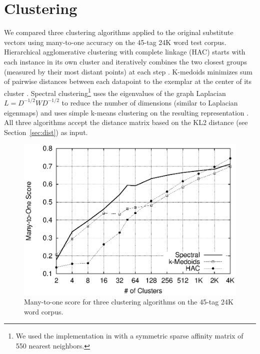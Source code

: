 \section{Clustering}
\label{sec:clustering}

We compared three clustering algorithms applied to the original
substitute vectors using many-to-one accuracy on the 45-tag 24K word
test corpus.  Hierarchical agglomerative clustering with complete
linkage (HAC) starts with each instance in its own cluster and
iteratively combines the two closest groups (measured by their most
distant points) at each step \cite{manning2008introduction}.
K-medoids minimizes sum of pairwise distances between each datapoint
to the exemplar at the center of its cluster
\cite{kaufman2005finding}.  Spectral clustering\footnote{We used the
  implementation in \cite{chen2011parallel} with a symmetric sparse
  affinity matrix of 550 nearest neighbors.} uses the eigenvalues of
the graph Laplacian $L=D^{-1/2} W D^{-1/2}$ to reduce the number of
dimensions (similar to Laplacian eigenmaps) and uses simple k-means
clustering on the resulting representation \cite{ng2002spectral}.  All
three algorithms accept the distance matrix based on the KL2 distance
(see Section~\ref{sec:dist}) as input.

\begin{figure}[h]
\includegraphics[width=.5\textwidth]{clustering_graph_mono.eps}
\caption{Many-to-one score for three clustering algorithms on the
  45-tag 24K word corpus.}
\label{fig:clustering}
\end{figure}



